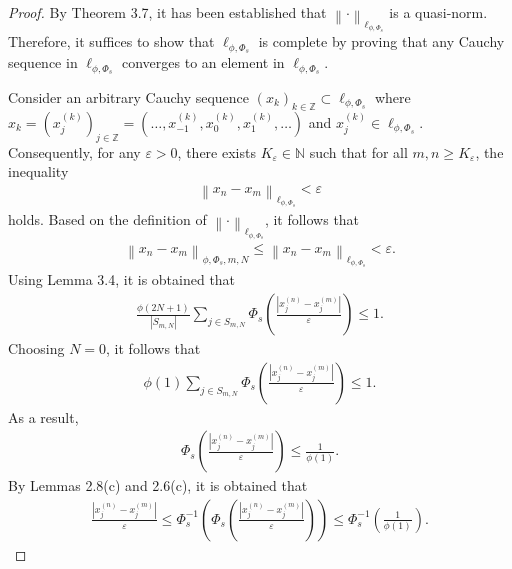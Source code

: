 \documentclass[12pt,a4paper]{article}
\theoremstyle{remark}
\begin{document}
\begin{proof}
    By Theorem 3.7, it has been established that $\left\lVert \cdot \right\rVert_{\ell_{\phi, \Phi_s}}$ is a quasi-norm. Therefore, it suffices to show that $\ell_{\phi, \Phi_s}$ is complete by proving that any Cauchy sequence in $\ell_{\phi, \Phi_s}$ converges to an element in $\ell_{\phi, \Phi_s}$.
    
    Consider an arbitrary Cauchy sequence $\left(x_k\right)_{k \in \mathbb{Z}} \subset \ell_{\phi, \Phi_s}$ where $x_k = \left(x_j^{(k)}\right)_{j \in \mathbb{Z}} = \left(\ldots, x_{-1}^{(k)}, x_0^{(k)}, x_1^{(k)}, \ldots\right)$ and $x_j^{(k)} \in \ell_{\phi, \Phi_s}$. Consequently, for any $\varepsilon > 0$, there exists $K_\varepsilon \in \mathbb{N}$ such that for all $m, n \geq K_\varepsilon$, the inequality
    \begin{eqnarray*}
        \left\lVert x_n - x_m \right\rVert_{\ell_{\phi, \Phi_s}} < \varepsilon
    \end{eqnarray*}
    holds. Based on the definition of $\left\lVert \cdot \right\rVert_{\ell_{\phi, \Phi_s}}$, it follows that
    \begin{eqnarray*}
        \left\lVert x_n - x_m \right\rVert_{\phi, \Phi_s, m, N} \leq \left\lVert x_n - x_m \right\rVert_{\ell_{\phi, \Phi_s}} < \varepsilon.
    \end{eqnarray*}
    Using Lemma 3.4, it is obtained that
    \begin{eqnarray*}
        \frac{\phi\left(2N+1\right)}{\left|S_{m, N}\right|} \sum_{j \in S_{m, N}} \Phi_s\left(\frac{\left|x_j^{(n)} - x_j^{(m)}\right|}{\varepsilon}\right) \leq 1.
    \end{eqnarray*}
    Choosing $N = 0$, it follows that 
    \begin{eqnarray*}
        \phi(1) \sum_{j \in S_{m, N}} \Phi_s\left(\frac{\left|x_j^{(n)} - x_j^{(m)}\right|}{\varepsilon}\right) \leq 1.
    \end{eqnarray*}
    As a result, 
    \begin{eqnarray*}
        \Phi_s\left(\frac{\left|x_j^{(n)} - x_j^{(m)}\right|}{\varepsilon}\right) \leq \frac{1}{\phi(1)}.
    \end{eqnarray*}
    By Lemmas 2.8(c) and 2.6(c), it is obtained that
    \begin{eqnarray*}
        \frac{\left|x_j^{(n)} - x_j^{(m)}\right|}{\varepsilon} \leq \Phi_s^{-1}\left(\Phi_s\left(\frac{\left|x_j^{(n)} - x_j^{(m)}\right|}{\varepsilon}\right)\right) \leq \Phi_s^{-1}\left(\frac{1}{\phi(1)}\right).
    \end{eqnarray*}

\end{proof}
\end{document}
